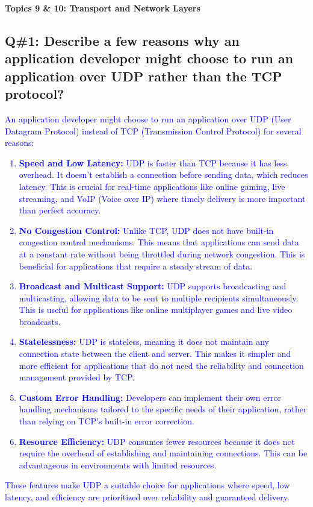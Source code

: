 \textbf{Topics 9 \& 10: Transport and Network Layers}
\subsection{Q\#1: Describe a few reasons why an application developer might choose to run an application over UDP rather than the TCP protocol?}
\textcolor{blue}{
An application developer might choose to run an application over UDP (User Datagram Protocol) instead of TCP (Transmission Control Protocol) for several reasons:
\begin{enumerate}
    \item \textbf{Speed and Low Latency:} UDP is faster than TCP because it has less overhead. It doesn't establish a connection before sending data, which reduces latency. This is crucial for real-time applications like online gaming, live streaming, and VoIP (Voice over IP) where timely delivery is more important than perfect accuracy.
    \item \textbf{No Congestion Control:} Unlike TCP, UDP does not have built-in congestion control mechanisms. This means that applications can send data at a constant rate without being throttled during network congestion. This is beneficial for applications that require a steady stream of data.
    \item \textbf{Broadcast and Multicast Support:} UDP supports broadcasting and multicasting, allowing data to be sent to multiple recipients simultaneously. This is useful for applications like online multiplayer games and live video broadcasts.
    \item \textbf{Statelessness:} UDP is stateless, meaning it does not maintain any connection state between the client and server. This makes it simpler and more efficient for applications that do not need the reliability and connection management provided by TCP.
    \item \textbf{Custom Error Handling:} Developers can implement their own error handling mechanisms tailored to the specific needs of their application, rather than relying on TCP's built-in error correction.
    \item \textbf{Resource Efficiency:} UDP consumes fewer resources because it does not require the overhead of establishing and maintaining connections. This can be advantageous in environments with limited resources.
\end{enumerate}
These features make UDP a suitable choice for applications where speed, low latency, and efficiency are prioritized over reliability and guaranteed delivery.
}
